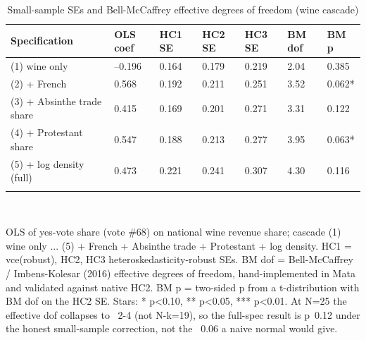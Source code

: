 \begin{table}[tbp] \centering
{}

\caption{Small-sample SEs and Bell-McCaffrey effective degrees of freedom (wine cascade)}
\label{tab:T_se_bm}
\begin{tabularx}{\linewidth}{@{}lCCCCCC@{}}

\toprule
{Specification}&{OLS coef}&{HC1 SE}&{HC2 SE}&{HC3 SE}&{BM dof}&{BM p} \tabularnewline
\midrule \addlinespace[\belowrulesep]
(1) wine only&--0.196&0.164&0.179&0.219&2.04&0.385 \tabularnewline
(2) + French&0.568&0.192&0.211&0.251&3.52&0.062* \tabularnewline
(3) + Absinthe trade share&0.415&0.169&0.201&0.271&3.31&0.122 \tabularnewline
(4) + Protestant share&0.547&0.188&0.213&0.277&3.95&0.063* \tabularnewline
(5) + log density (full)&0.473&0.221&0.241&0.307&4.30&0.116 \tabularnewline
\bottomrule \addlinespace[\belowrulesep]

\end{tabularx}
\\ \parbox{\linewidth}{\footnotesize OLS of yes-vote share (vote \#68) on national wine revenue share; cascade (1) wine only ... (5) + French + Absinthe trade + Protestant + log density. HC1 = vce(robust), HC2, HC3 heteroskedasticity-robust SEs. BM dof = Bell-McCaffrey / Imbens-Kolesar (2016) effective degrees of freedom, hand-implemented in Mata and validated against native HC2. BM p = two-sided p from a t-distribution with BM dof on the HC2 SE. Stars: * p<0.10, ** p<0.05, *** p<0.01. At N=25 the effective dof collapses to ~2-4 (not N-k=19), so the full-spec result is p~0.12 under the honest small-sample correction, not the ~0.06 a naive normal would give.}
\end{table}
